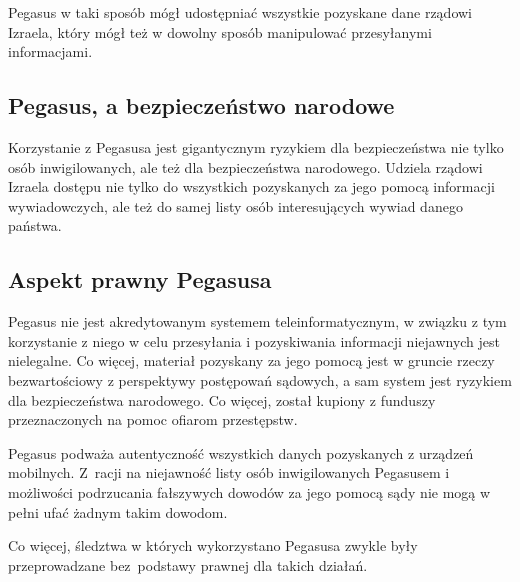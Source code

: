 \documentclass{article}
\begin{document}
Pegasus w taki sposób mógł udostępniać wszystkie pozyskane dane rządowi Izraela, który mógł też w dowolny sposób manipulować przesyłanymi informacjami.

\subsection{Pegasus, a bezpieczeństwo narodowe}

Korzystanie z Pegasusa jest gigantycznym ryzykiem dla bezpieczeństwa nie tylko osób inwigilowanych, ale też dla bezpieczeństwa narodowego. Udziela rządowi Izraela dostępu nie tylko do wszystkich pozyskanych za jego pomocą informacji wywiadowczych, ale też do samej listy osób interesujących wywiad danego państwa.

\subsection{Aspekt prawny Pegasusa}

Pegasus nie jest akredytowanym systemem teleinformatycznym, w związku z tym korzystanie z niego w celu przesyłania i pozyskiwania informacji niejawnych jest nielegalne. Co więcej, materiał pozyskany za jego pomocą jest w gruncie rzeczy bezwartościowy z perspektywy postępowań sądowych, a sam system jest ryzykiem dla bezpieczeństwa narodowego. Co więcej, został kupiony z funduszy przeznaczonych na pomoc ofiarom przestępstw.

Pegasus podważa autentyczność wszystkich danych pozyskanych z urządzeń mobilnych. Z~racji na niejawność listy osób inwigilowanych Pegasusem i możliwości podrzucania fałszywych dowodów za jego pomocą sądy nie mogą w pełni ufać żadnym takim dowodom.

Co więcej, śledztwa w których wykorzystano Pegasusa zwykle były przeprowadzane bez~podstawy prawnej dla takich działań.
\end{document}
